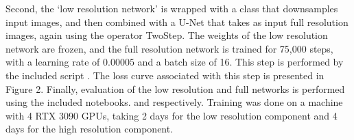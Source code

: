 \documentclass[10pt,onecolumn,letterpaper]{article} %
\begin{document}
Second, the `low resolution network' is wrapped with a class that downsamples input images, and then combined with a U-Net that takes as input full resolution images, again using the operator TwoStep. The weights of the low resolution network are frozen, and the full resolution network is trained for 75,000 steps, with a learning rate of $0.00005$ and a batch size of 16. This step is performed by the included script . The loss curve associated with this step is presented in Figure 2.
Finally, evaluation of the low resolution and full networks is performed using the included notebooks.   and  respectively. Training was done on a machine with 4 RTX 3090 GPUs, taking 2 days for the low resolution component and 4 days for the high resolution component.
\end{document}
